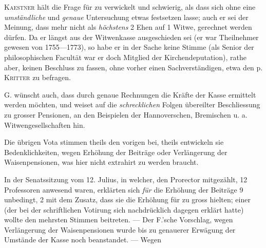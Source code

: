 \textsc{Kaestner} hält die Frage für zu verwickelt und schwierig, als dass sich ohne eine \textit{umständliche} und \textit{genaue} Untersuchung etwas festsetzen lasse; auch er sei der Meinung, dass mehr nicht als \textit{höchstens} 2 Ehen auf 1 Witwe, gerechnet werden dürfen. Da er längst aus der Witwenkasse ausgeschieden sei (er war Theilnehmer gewesen von 1755—1773), so habe er in der Sache keine Stimme (als Senior der philosophischen Facultät war er doch Mitglied der Kirchendeputation), rathe aber, keinen Beschluss zu fassen, ohne vorher einen Sachverständigen, etwa den p. \textsc{Kritter} zu befragen.

G. wünscht auch, dass durch genaue Rechnungen die Kräfte der Kasse ermittelt werden möchten, und weiset auf die \textit{schrecklichen} Folgen übereilter Beschliessung zu grosser Pensionen, an den Beispielen der Hannoverschen, Bremischen u. a. Witwengesellschaften hin.

Die übrigen Vota stimmen theils den vorigen bei, theils entwickeln sie Bedenklichkeiten, wegen Erhöhung der Beiträge oder Verlängerung der Waisenpensionen, was hier nicht extrahirt zu werden braucht.

In der Senatssitzung vom 12. Julius, in welcher, den Prorector mitgezählt, 12 Professoren anwesend waren, erklärten sich \textit{für} die Erhöhung der Beiträge 9 unbedingt, 2 mit dem Zusatz, dass sie die Erhöhung für zu gross hielten; einer (der bei der schriftlichen Votirung sich nachdrücklich dagegen erklärt hatte) wollte den mehrsten Stimmen beitreten. — Der F.’sche Vorschlag, wegen Verlängerung der Waisenpensionen wurde bis zu genauerer Erwägung der Umstände der Kasse noch beanstandet. — Wegen
